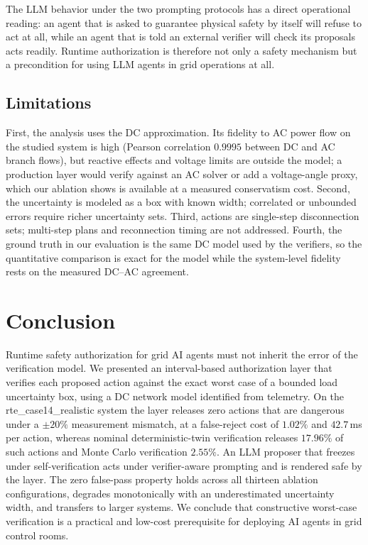 \documentclass[11pt,a4paper]{article}
\begin{document}
The LLM behavior under the two prompting protocols has a direct operational
reading: an agent that is asked to guarantee physical safety by itself will
refuse to act at all, while an agent that is told an external verifier will
check its proposals acts readily. Runtime authorization is therefore not only a
safety mechanism but a precondition for using LLM agents in grid operations at
all.

\subsection{Limitations}

First, the analysis uses the DC approximation. Its fidelity to AC power flow on
the studied system is high (Pearson correlation $0.9995$ between DC and AC
branch flows), but reactive effects and voltage limits are outside the model; a
production layer would verify against an AC solver or add a voltage-angle proxy,
which our ablation shows is available at a measured conservatism cost. Second,
the uncertainty is modeled as a box with known width; correlated or unbounded
errors require richer uncertainty sets. Third, actions are single-step
disconnection sets; multi-step plans and reconnection timing are not addressed.
Fourth, the ground truth in our evaluation is the same DC model used by the
verifiers, so the quantitative comparison is exact for the model while the
system-level fidelity rests on the measured DC--AC agreement.

\section{Conclusion}
\label{sec:conclusion}

Runtime safety authorization for grid AI agents must not inherit the error of
the verification model. We presented an interval-based authorization layer that
verifies each proposed action against the exact worst case of a bounded load
uncertainty box, using a DC network model identified from telemetry. On the
rte\_case14\_realistic system the layer releases zero actions that are dangerous
under a $\pm 20\%$ measurement mismatch, at a false-reject cost of $1.02\%$ and
$42.7$\,ms per action, whereas nominal deterministic-twin verification releases
$17.96\%$ of such actions and Monte Carlo verification $2.55\%$. An LLM proposer
that freezes under self-verification acts under verifier-aware prompting and is
rendered safe by the layer. The zero false-pass property holds across all
thirteen ablation configurations, degrades monotonically with an
underestimated uncertainty width, and transfers to larger systems. We conclude
that constructive worst-case verification is a practical and low-cost
prerequisite for deploying AI agents in grid control rooms.



\end{document}
